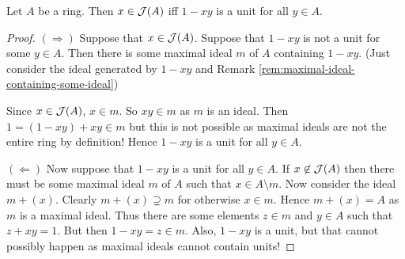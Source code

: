 \begin{lemma}
    Let $A$ be a ring. Then $x\in {\cal J} (A)$ iff $1-xy$ is a unit for all $y\in A$.
    \label{lemma:equiv-Jacobson}
\end{lemma}
\begin{proof}
    $\left( \Longrightarrow \right)$ Suppose that $x \in {\cal J}(A)$. Suppose that $1-xy$ is not a unit for some $y\in A$. Then there is some maximal ideal $m$ of $A$ containing $1-xy$. (Just consider the ideal generated by $1-xy$ and Remark \ref{rem:maximal-ideal-containing-some-ideal})

    Since $x\in {\cal J}(A)$, $x\in m$. So $xy\in m$ as $m$ is an ideal. Then $1= (1-xy)+xy \in m$ but this is not possible as maximal ideals are not the entire ring by definition! Hence $1-xy $ is a unit for all $y\in A$.

    $\left( \Longleftarrow \right)$ Now suppose that $1-xy$ is a unit for all $y\in A$. If $x\not \in {\cal J} (A)$ then there must be some maximal ideal $m$ of $A$ such that $x\in A\setminus m$. Now consider the ideal $m + (x)$. Clearly $m + (x) \supsetneq m$ for otherwise $x\in m$. Hence $m+ (x)=A$ as $m$ is a maximal ideal. Thus there are some elements $z\in m$ and $y \in A$ such that $z+xy =1$. But then $1-xy = z \in m$. Also, $1-xy$ is a unit, but that cannot possibly happen as maximal ideals cannot contain units!
\end{proof}
